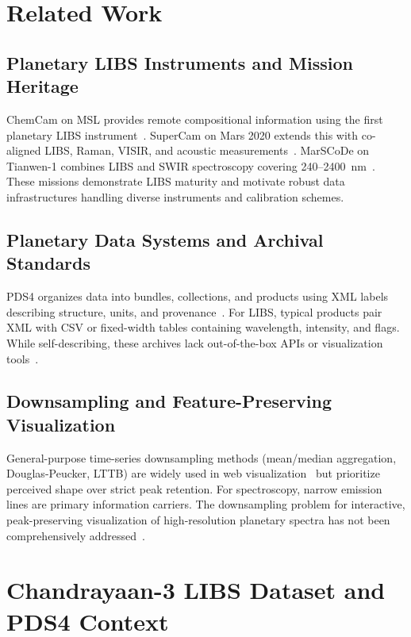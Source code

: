 \documentclass[11pt,a4paper]{article}
\begin{document}
\section{Related Work}
\label{sec:related}

\subsection{Planetary LIBS Instruments and Mission Heritage}

ChemCam on MSL provides remote compositional information using the first planetary LIBS instrument~\cite{Wiens2012,Maurice2012}. SuperCam on Mars 2020 extends this with co-aligned LIBS, Raman, VISIR, and acoustic measurements~\cite{Wiens2020,Bernardi2021}. MarSCoDe on Tianwen-1 combines LIBS and SWIR spectroscopy covering 240--2400~nm~\cite{Xu2021,MarSCoDe2024}. These missions demonstrate LIBS maturity and motivate robust data infrastructures handling diverse instruments and calibration schemes.

\subsection{Planetary Data Systems and Archival Standards}

PDS4 organizes data into bundles, collections, and products using XML labels describing structure, units, and provenance~\cite{Hughes2018}. For LIBS, typical products pair XML with CSV or fixed-width tables containing wavelength, intensity, and flags. While self-describing, these archives lack out-of-the-box APIs or visualization tools~\cite{GDALPDS4}.

\subsection{Downsampling and Feature-Preserving Visualization}

General-purpose time-series downsampling methods (mean/median aggregation, Douglas-Peucker, LTTB) are widely used in web visualization~\cite{amCharts} but prioritize perceived shape over strict peak retention. For spectroscopy, narrow emission lines are primary information carriers. The downsampling problem for interactive, peak-preserving visualization of high-resolution planetary spectra has not been comprehensively addressed~\cite{Cremers2006}.

\section{Chandrayaan-3 LIBS Dataset and PDS4 Context}
\label{sec:data}
\end{document}
